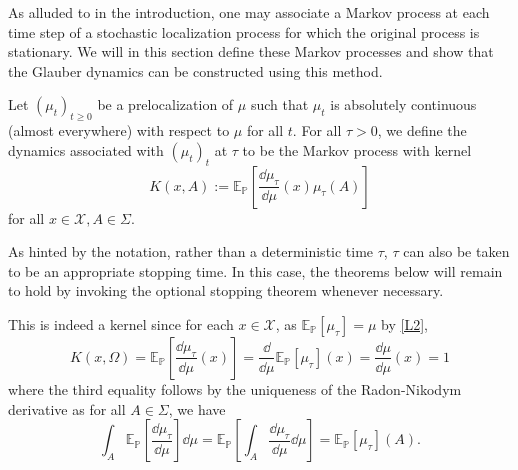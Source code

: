 As alluded to in the introduction, one may associate a Markov process at each time step of a stochastic 
localization process for which the original process is stationary. We will in this section define 
these Markov processes and show that the Glauber dynamics can be constructed using this method. 

\begin{definition}
  Let \((\mu_t)_{t \ge 0}\) be a prelocalization of \(\mu\) such that \(\mu_t\) is absolutely 
  continuous (almost everywhere) with respect to \(\mu\) for all \(t\). For all \(\tau > 0\), we define the dynamics 
  associated with \((\mu_t)_t\) at \(\tau\) to be the Markov process with kernel 
  \[K(x, A) := \mathbb{E}_\mathbb{P}\left[\frac{\dd \mu_\tau}{\dd \mu}(x) \mu_\tau(A)\right]\]
  for all \(x \in \mathcal{X}, A \in \Sigma\).
\end{definition}

As hinted by the notation, rather than a deterministic time \(\tau\), \(\tau\) can also be taken to be an 
appropriate stopping time. In this case, the theorems below will remain to hold by invoking the optional stopping 
theorem whenever necessary.

This is indeed a kernel since for each \(x \in \mathcal{X}\), as \(\mathbb{E}_\mathbb{P}[\mu_\tau] = \mu\) 
by \eqref{L2},
\[K(x, \Omega) = \mathbb{E}_\mathbb{P}\left[\frac{\dd \mu_\tau}{\dd \mu}(x)\right] 
  = \frac{\dd}{\dd \mu}\mathbb{E}_\mathbb{P}[\mu_\tau](x) = \frac{\dd \mu}{\dd \mu}(x) = 1\]
where the third equality follows by the uniqueness of the Radon-Nikodym derivative as for all \(A \in \Sigma\), 
we have
\[\int_A \mathbb{E}_\mathbb{P}\left[\frac{\dd \mu_\tau}{\dd \mu}\right] \dd \mu = 
  \mathbb{E}_\mathbb{P}\left[\int_A \frac{\dd \mu_\tau}{\dd \mu} \dd \mu \right] = 
  \mathbb{E}_\mathbb{P}[\mu_\tau](A).\]

